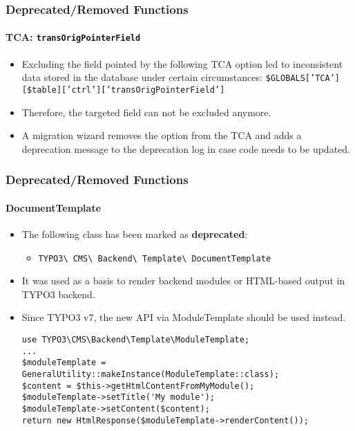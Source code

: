 \begin{frame}[fragile]
	\frametitle{Deprecated/Removed Functions}
	\framesubtitle{TCA: \texttt{transOrigPointerField}}

	\begin{itemize}
		\item Excluding the field pointed by the following TCA option led to
			inconsistent data stored in the database under certain circumstances:
			\small
				\texttt{\$GLOBALS['TCA'][\$table]['ctrl']['transOrigPointerField']}
			\normalsize

		\item Therefore, the targeted field can not be excluded anymore.
		\item A migration wizard removes the option from the TCA and adds a deprecation
			message to the deprecation log in case code needs to be updated.
	\end{itemize}

\end{frame}


\begin{frame}[fragile]
	\frametitle{Deprecated/Removed Functions}
	\framesubtitle{DocumentTemplate}

	\lstset{basicstyle=\tiny\ttfamily}

	\begin{itemize}
		\item The following class has been marked as \textbf{deprecated}:

			\begin{itemize}
				\item \texttt{TYPO3\textbackslash
					CMS\textbackslash
					Backend\textbackslash
					Template\textbackslash
					DocumentTemplate}
			\end{itemize}

		\item It was used as a basis to render backend modules or HTML-based output in TYPO3 backend.
		\item Since TYPO3 v7, the new API via ModuleTemplate should be used instead.
\begin{lstlisting}
use TYPO3\CMS\Backend\Template\ModuleTemplate;
...
$moduleTemplate = GeneralUtility::makeInstance(ModuleTemplate::class);
$content = $this->getHtmlContentFromMyModule();
$moduleTemplate->setTitle('My module');
$moduleTemplate->setContent($content);
return new HtmlResponse($moduleTemplate->renderContent());
\end{lstlisting}

	\end{itemize}

\end{frame}

